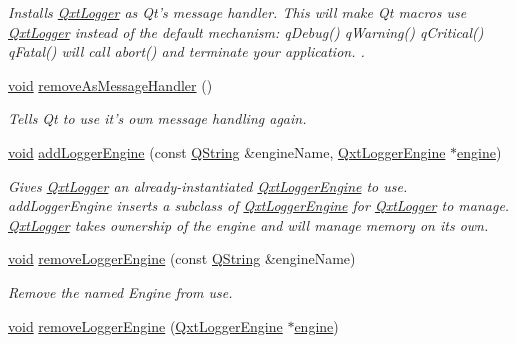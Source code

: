 \begin{DoxyCompactItemize}
\begin{DoxyCompactList}\small\item\em Installs \hyperlink{class_qxt_logger}{Qxt\-Logger} as Qt's message handler. This will make Qt macros use \hyperlink{class_qxt_logger}{Qxt\-Logger} instead of the default mechanism\-:   q\-Debug()  q\-Warning()  q\-Critical()  q\-Fatal() will call abort() and terminate your application. . \end{DoxyCompactList}\item 
\hyperlink{group___u_a_v_objects_plugin_ga444cf2ff3f0ecbe028adce838d373f5c}{void} \hyperlink{class_qxt_logger_a54ae0257f8a90576ef449d04d4db5577}{remove\-As\-Message\-Handler} ()
\begin{DoxyCompactList}\small\item\em Tells Qt to use it's own message handling again. \end{DoxyCompactList}\item 
\hyperlink{group___u_a_v_objects_plugin_ga444cf2ff3f0ecbe028adce838d373f5c}{void} \hyperlink{class_qxt_logger_a9203eda8144d21753be22073384f3d24}{add\-Logger\-Engine} (const \hyperlink{group___u_a_v_objects_plugin_gab9d252f49c333c94a72f97ce3105a32d}{Q\-String} \&engine\-Name, \hyperlink{class_qxt_logger_engine}{Qxt\-Logger\-Engine} $\ast$\hyperlink{class_qxt_logger_add68d45798d759b9b96824e1f6b86967}{engine})
\begin{DoxyCompactList}\small\item\em Gives \hyperlink{class_qxt_logger}{Qxt\-Logger} an already-\/instantiated \hyperlink{class_qxt_logger_engine}{Qxt\-Logger\-Engine} to use. add\-Logger\-Engine inserts a subclass of \hyperlink{class_qxt_logger_engine}{Qxt\-Logger\-Engine} for \hyperlink{class_qxt_logger}{Qxt\-Logger} to manage. \hyperlink{class_qxt_logger}{Qxt\-Logger} takes ownership of the engine and will manage memory on its own. \end{DoxyCompactList}\item 
\hyperlink{group___u_a_v_objects_plugin_ga444cf2ff3f0ecbe028adce838d373f5c}{void} \hyperlink{class_qxt_logger_ac3f2f94905b6da0d645025b3f964ad72}{remove\-Logger\-Engine} (const \hyperlink{group___u_a_v_objects_plugin_gab9d252f49c333c94a72f97ce3105a32d}{Q\-String} \&engine\-Name)
\begin{DoxyCompactList}\small\item\em Remove the named Engine from use. \end{DoxyCompactList}\item 
\hyperlink{group___u_a_v_objects_plugin_ga444cf2ff3f0ecbe028adce838d373f5c}{void} \hyperlink{class_qxt_logger_ae4b3db05c60afe94c018f0d532e60bc3}{remove\-Logger\-Engine} (\hyperlink{class_qxt_logger_engine}{Qxt\-Logger\-Engine} $\ast$\hyperlink{class_qxt_logger_add68d45798d759b9b96824e1f6b86967}{engine})

\end{DoxyCompactItemize}
